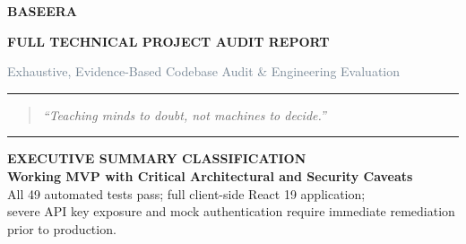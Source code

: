 \documentclass[10pt,a4paper]{report}
\begin{document}
\begin{titlepage}
    \centering
    \vspace*{1cm}
    
    {\Huge \bfseries \textcolor{primaryMaroon}{BASEERA} \par}
    \vspace{0.3cm}
    {\LARGE \bfseries \textcolor{primaryBlue}{FULL TECHNICAL PROJECT AUDIT REPORT} \par}
    \vspace{0.4cm}
    {\large \textcolor{slateGray}{Exhaustive, Evidence-Based Codebase Audit \& Engineering Evaluation} \par}
    
    \vspace{1.2cm}
    \rule{\linewidth}{1.5pt}
    \vspace{0.4cm}
    
    \begin{quote}
        \centering
        \itshape\large
        ``Teaching minds to doubt, not machines to decide.''
    \end{quote}
    
    \vspace{0.4cm}
    \rule{\linewidth}{1.5pt}
    \vspace{1.5cm}
    
    \begin{tcolorbox}[colback=lightBg,colframe=primaryMaroon,arc=3mm,width=0.92\linewidth]
        \centering
        \textbf{EXECUTIVE SUMMARY CLASSIFICATION} \\
        \vspace{0.2cm}
        \textcolor{critRed}{\bfseries Working MVP with Critical Architectural and Security Caveats} \\
        \vspace{0.15cm}
        \small All 49 automated tests pass; full client-side React 19 application; \\
        severe API key exposure and mock authentication require immediate remediation prior to production.
    \end{tcolorbox}
    
    \vspace{1.5cm}
    

\end{titlepage}
\end{document}
